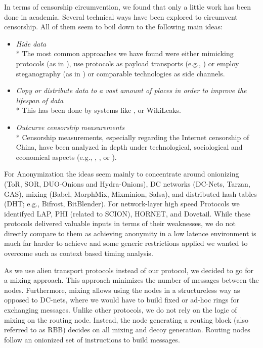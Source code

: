 \documentclass[acmsmall, screen]{acmart}
\begin{document}
In terms of censorship circumvention, we found that only a little work has been done in academia. Several technical ways have been explored to circumvent censorship. All of them seem to boil down to the following main ideas:
\begin{itemize}
	\item \emph{Hide data}\\*
	The most common approaches we have found were either mimicking protocols (as in \cite{mohajeri2013skypemorph}), use protocols as payload transports (e.g., \cite{AthanRAM07}) or employ steganography (as in \cite{f5}) or comparable technologies as side channels.
	\item \emph{Copy or distribute data to a vast amount of places in order to improve the lifespan of data}\\*
	This has been done by systems like \cite{freenet}, or WikiLeaks.
	\item \emph{Outcurve censorship measurements}\\*
	Censorship measurements, especially regarding the Internet censorship of China, have been analyzed in depth under technological, sociological and economical aspects (e.g., \cite{Ensafi_2015}, \cite{Clayton_2006}, or \cite{lowe2007great}).
\end{itemize}

For Anonymization the ideas seem mainly to concentrate around onionizing (ToR\cite{tor-spec}, SOR\cite{Egners_2012}, DUO-Onions and Hydra-Onions\cite{iwanik2005duo}), DC networks (DC-Nets\cite{chaum-dc}, Tarzan\cite{tarzan:ccs02}, GAS\cite{AthanRAM07}), mixing (Babel\cite{babel}, MorphMix\cite{morphmix:wpes2002}, Mixminion\cite{minion-design}, Salsa\cite{Salsa}), and distributed hash tables (DHT; e.g., Bifrost\cite{Kondo2009}, BitBlender\cite{Bauer_2008}). For network-layer high speed Protocols we identifyed LAP\cite{hsiao2012lap}, PHI (related to SCION\cite{perrig2017scion}), HORNET\cite{chen2015hornet}, and Dovetail\cite{chen2015hornet}. While these protocols delivered valuable inputs in terms of their weaknesses, we do not directly compare to them as achieving anonymity in a low latence environment is much far harder to achieve and some generic restrictions applied we wanted to overcome such as context based timing analysis.

As we use alien transport protocols instead of our protocol, we decided to go for a mixing approach. This approach minimizes the number of messages between the nodes. Furthermore, mixing allows using the nodes in a structureless way as opposed to DC-nets, where we would have to build fixed or ad-hoc rings for exchanging messages. Unlike other protocols, we do not rely on the logic of mixing on the routing node. Instead, the node generating a routing block (also referred to as RBB) decides on all mixing and decoy generation. Routing nodes follow an onionized set of instructions to build messages. 
\end{document}
